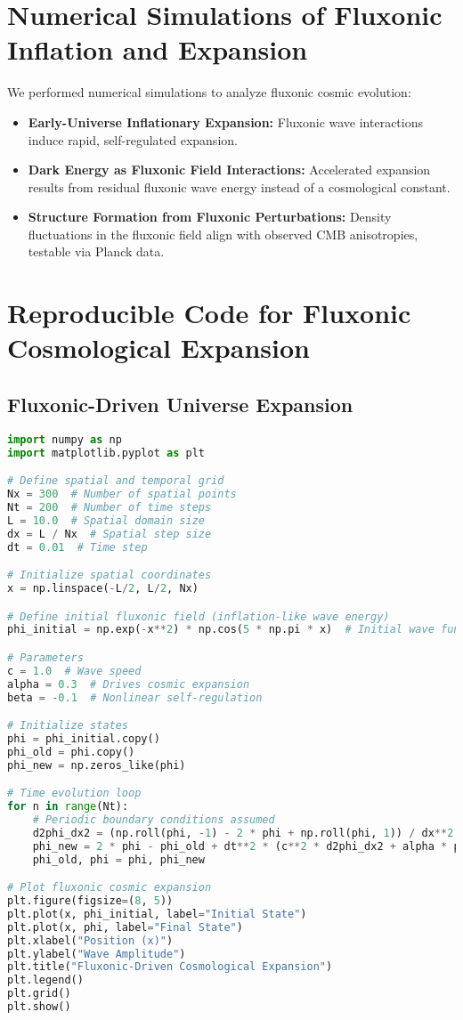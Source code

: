 \documentclass{article}
\begin{document}
\section{Numerical Simulations of Fluxonic Inflation and Expansion}
We performed numerical simulations to analyze fluxonic cosmic evolution:
\begin{itemize}
    \item \textbf{Early-Universe Inflationary Expansion:} Fluxonic wave interactions induce rapid, self-regulated expansion.
    \item \textbf{Dark Energy as Fluxonic Field Interactions:} Accelerated expansion results from residual fluxonic wave energy instead of a cosmological constant.
    \item \textbf{Structure Formation from Fluxonic Perturbations:} Density fluctuations in the fluxonic field align with observed CMB anisotropies, testable via Planck data.
\end{itemize}

\section{Reproducible Code for Fluxonic Cosmological Expansion}
\subsection{Fluxonic-Driven Universe Expansion}
\begin{lstlisting}[language=Python, caption=Fluxonic-Driven Universe Expansion, label=lst:expansion]
import numpy as np
import matplotlib.pyplot as plt

# Define spatial and temporal grid
Nx = 300  # Number of spatial points
Nt = 200  # Number of time steps
L = 10.0  # Spatial domain size
dx = L / Nx  # Spatial step size
dt = 0.01  # Time step

# Initialize spatial coordinates
x = np.linspace(-L/2, L/2, Nx)

# Define initial fluxonic field (inflation-like wave energy)
phi_initial = np.exp(-x**2) * np.cos(5 * np.pi * x)  # Initial wave function

# Parameters
c = 1.0  # Wave speed
alpha = 0.3  # Drives cosmic expansion
beta = -0.1  # Nonlinear self-regulation

# Initialize states
phi = phi_initial.copy()
phi_old = phi.copy()
phi_new = np.zeros_like(phi)

# Time evolution loop
for n in range(Nt):
    # Periodic boundary conditions assumed
    d2phi_dx2 = (np.roll(phi, -1) - 2 * phi + np.roll(phi, 1)) / dx**2
    phi_new = 2 * phi - phi_old + dt**2 * (c**2 * d2phi_dx2 + alpha * phi + beta * phi**3)
    phi_old, phi = phi, phi_new

# Plot fluxonic cosmic expansion
plt.figure(figsize=(8, 5))
plt.plot(x, phi_initial, label="Initial State")
plt.plot(x, phi, label="Final State")
plt.xlabel("Position (x)")
plt.ylabel("Wave Amplitude")
plt.title("Fluxonic-Driven Cosmological Expansion")
plt.legend()
plt.grid()
plt.show()
\end{lstlisting}
\end{document}
